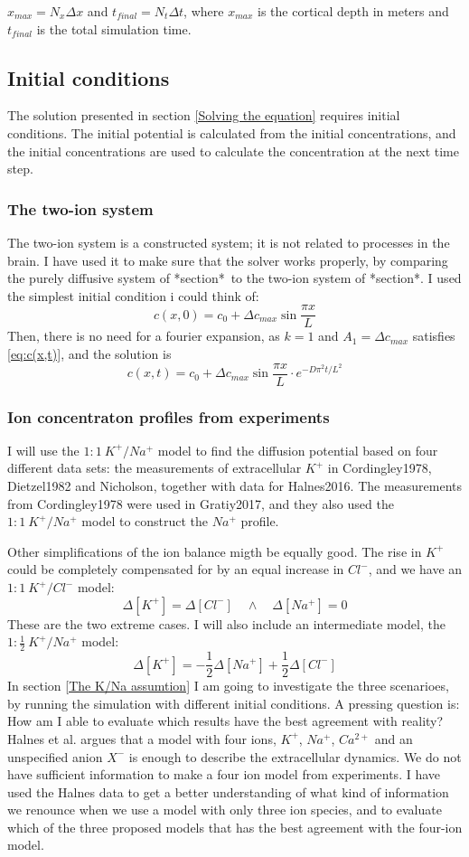\documentclass{article}
\begin{document}
$x_{max} =N_x \Delta x$ and $t_{final} = N_t \Delta t$, where $x_{max}$ is the cortical depth in meters and $t_{final}$ is the total simulation time.
\subsection{Initial conditions}\label{Initial conditions}
The solution presented in section \ref{Solving the equation} requires initial conditions. The initial potential is calculated from the initial concentrations, and the initial concentrations are used to calculate the concentration at the next time step.
\subsubsection{The two-ion system}
The two-ion system is a constructed system; it is not related to processes in the brain. I have used it to make sure that the solver works properly, by comparing the purely diffusive system of *section*\ to the two-ion system of *section*. I used the simplest initial condition i could think of: 
$$c(x,0) =c_0 +  \Delta c_{max}\sin{\frac{\pi x}{L}}$$
Then, there is no need for a fourier expansion, as $k=1$ and $A_1 = \Delta c_{max}$ satisfies \ref{eq:c(x,t)}, and the solution is
\begin{equation*}
c(x,t) =c_0 + \Delta c_{max} \sin \frac{ \pi x}{L}\cdot e^{-D\pi^2 t /L^2}
\end{equation*}
\subsubsection{Ion concentraton profiles from experiments}
 I will use the $1\!:\!1\ K^+\!/Na^+$ model to find the diffusion potential based on four different data sets: the measurements of extracellular $K^+$ in Cordingley1978, Dietzel1982 and Nicholson, together with data for Halnes2016. The measurements from Cordingley1978 were used in Gratiy2017, and they also used the $1\!:\!1\ K^+\!/Na^+$ model to construct the $Na^+$ profile. 


Other simplifications of the ion balance migth be equally good. The rise in $K^+$ could be completely compensated for by an equal increase in $Cl^-$, and we have an $1\!:\!1\ K^+\!/Cl^-$ model:
  $$\Delta [K^+] = \Delta [Cl^-] \quad \land \quad \Delta [Na^+] =0$$
These are the two extreme cases. I will also include an intermediate model, the $1\!:\!\frac{1}{2}\ K^+\!/Na^+$ model:
 $$\Delta [K^+] = -\frac{1}{2} \Delta [Na^+] +\frac{1}{2} \Delta [Cl^-] $$ 
 In section \ref{The K/Na assumtion} I am going to investigate the three scenarioes, by running the simulation with different initial conditions. A pressing question is: How am I able to evaluate which results have the best agreement with reality? 
Halnes et al. argues that a model with four ions, $K^+$, $Na^+$, $Ca^{2+}$ and an unspecified anion $X^-$ is enough to describe the extracellular dynamics. We do not have sufficient information to make a four ion model from experiments. I have used the Halnes data to get a better understanding of what kind of information we renounce when we use a model with only three ion species, and to evaluate which of the three proposed models that has the best agreement with the four-ion model.
\end{document}
